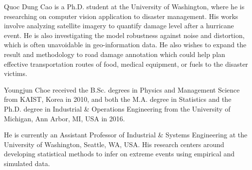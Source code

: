 \documentclass[journal, 12pt, onecolumn,draftclsnofoot]{IEEEtran}
\begin{document}
\begin{IEEEbiography}{Quoc Dung Cao}
is a Ph.D. student at the University of Washington, where he is researching on
computer vision application to disaster management. His works involve analyzing satellite imagery to quantify damage level after a hurricane event. He is also investigating the model robustness against noise and distortion, which is often unavoidable in geo-information data. He also wishes to expand the result and methodology to road damage annotation which could help plan effective transportation routes of food, medical equipment, or fuels to the disaster victims.
\end{IEEEbiography}

\begin{IEEEbiography}{Youngjun Choe}
received the B.Sc. degrees in Physics and Management Science from KAIST, Korea in 2010, and both the M.A. degree in Statistics and the Ph.D. degree in Industrial \& Operations Engineering from the University of Michigan, Ann Arbor, MI, USA in 2016. 

He is currently an Assistant Professor of Industrial \& Systems Engineering at the University of Washington, Seattle, WA, USA. His research centers around developing statistical methods to infer on extreme events using empirical and simulated data. 
\end{IEEEbiography}










\end{document}
